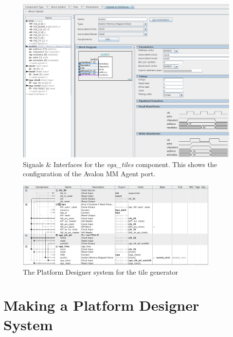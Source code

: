 \documentclass[11pt]{article}
\begin{document}
\begin{figure}
  \includegraphics[width=\textwidth]{qsys-component.png}
  \caption{Signals \& Interfaces for the \emph{vga\_tiles} component.
     This shows the configuration of the Avalon MM Agent port.}
  \label{fig:qsys-component}
\end{figure}

\clearpage



\begin{figure}
  \centerline{\includegraphics[width=0.9\textwidth]{qsys-system.pdf}}
  
  \vspace{-0.8\baselineskip}
  
  \caption{The Platform Designer system for the tile generator}
  \label{fig:qsys}
\end{figure}

\section{Making a Platform Designer System}
\end{document}
